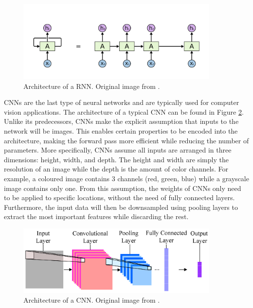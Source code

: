 \begin{figure}[h]
    \centering
    \includegraphics[width=0.9\textwidth]{images/ch2/02RNN.png}
    \caption{Architecture of a RNN.  Original image from \cite{NN}.}
    \label{fig:02RNN}
\end{figure}

CNNs are the last type of neural networks and are typically used for computer vision applications. The architecture of a typical CNN can be found in Figure \ref{fig:02CNN}. Unlike its predecessors, CNNs make the explicit assumption that inputs to the network will be images. This enables certain properties to be encoded into the architecture, making the forward pass more efficient while reducing the number of parameters.  More specifically, CNNs assume all inputs are arranged in three dimensions: height, width, and depth.  The height and width are simply the resolution of an image while the depth is the amount of color channels.  For example, a coloured image contains 3 channels (red, green, blue) while a grayscale image contains only one.  From this assumption, the weights of CNNs only need to be applied to specific locations, without the need of fully connected layers.  Furthermore, the input data will then be downsampled using pooling layers to extract the most important features while discarding the rest.  

\begin{figure}[h]
    \centering
    \includegraphics[width=0.9\textwidth]{images/ch2/02CNN.png}
    \caption{Architecture of a CNN.  Original image from \cite{NN}.}
    \label{fig:02CNN}
\end{figure}

